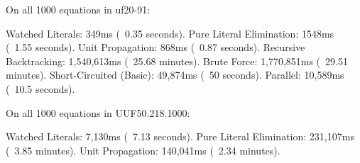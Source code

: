 \begin{FVerbatim}
On all 1000 equations in uf20-91:

Watched Literals:          349ms (~0.35 seconds).
Pure Literal Elimination:  1548ms (~1.55 seconds).
Unit Propagation:          868ms (~0.87 seconds).
Recursive Backtracking:    1,540,613ms (~25.68 minutes).
Brute Force:               1,770,851ms (~29.51 minutes).
Short-Circuited (Basic):   49,874ms (~50 seconds).
Parallel:                  10,589ms (~10.5 seconds).

On all 1000 equations in UUF50.218.1000:

Watched Literals:         7,130ms (~7.13 seconds).
Pure Literal Elimination: 231,107ms (~3.85 minutes).
Unit Propagation:         140,041ms (~2.34 minutes).
\end{FVerbatim}